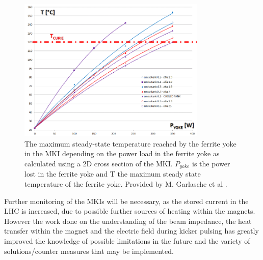 \begin{figure}
\begin{center}
\includegraphics[width=0.8\textwidth]{LHC_MKI/figures/tempPowMarco.png}
\end{center}
\caption{The maximum steady-state temperature reached by the ferrite yoke in the MKI depending on the power load in the ferrite yoke as calculated using a 2D cross section of the MKI. $P_{yoke}$ is the power lost in the ferrite yoke and T the maximum steady state temperature of the ferrite yoke. Provided by M. Garlasche et al \cite{Garlasche:2dHeatEmisAll}.}
\label{fig:pow-loss-stable-temp-mkis}
\end{figure} 

Further monitoring of the MKIs will be necessary, as the stored current in the LHC is increased, due to possible further sources of heating within the magnets. However the work done on the understanding of the beam impedance, the heat transfer within the magnet and the electric field during kicker pulsing has greatly improved the knowledge of possible limitations in the future and the variety of solutions/counter measures that may be implemented. 